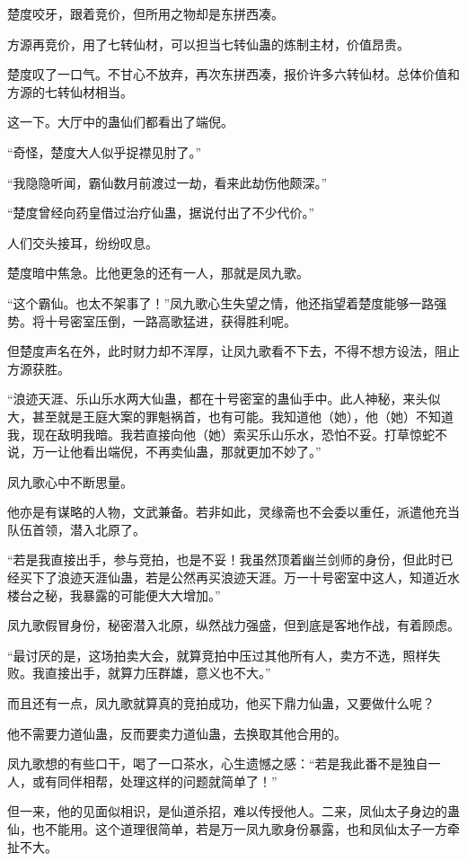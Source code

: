 \begin{this_body}
楚度咬牙，跟着竞价，但所用之物却是东拼西凑。

方源再竞价，用了七转仙材，可以担当七转仙蛊的炼制主材，价值昂贵。

楚度叹了一口气。不甘心不放弃，再次东拼西凑，报价许多六转仙材。总体价值和方源的七转仙材相当。

这一下。大厅中的蛊仙们都看出了端倪。

“奇怪，楚度大人似乎捉襟见肘了。”

“我隐隐听闻，霸仙数月前渡过一劫，看来此劫伤他颇深。”

“楚度曾经向药皇借过治疗仙蛊，据说付出了不少代价。”

人们交头接耳，纷纷叹息。

楚度暗中焦急。比他更急的还有一人，那就是凤九歌。

“这个霸仙。也太不架事了！”凤九歌心生失望之情，他还指望着楚度能够一路强势。将十号密室压倒，一路高歌猛进，获得胜利呢。

但楚度声名在外，此时财力却不浑厚，让凤九歌看不下去，不得不想方设法，阻止方源获胜。

“浪迹天涯、乐山乐水两大仙蛊，都在十号密室的蛊仙手中。此人神秘，来头似大，甚至就是王庭大案的罪魁祸首，也有可能。我知道他（她），他（她）不知道我，现在敌明我暗。我若直接向他（她）索买乐山乐水，恐怕不妥。打草惊蛇不说，万一让他看出端倪，不再卖仙蛊，那就更加不妙了。”

凤九歌心中不断思量。

他亦是有谋略的人物，文武兼备。若非如此，灵缘斋也不会委以重任，派遣他充当队伍首领，潜入北原了。

“若是我直接出手，参与竞拍，也是不妥！我虽然顶着幽兰剑师的身份，但此时已经买下了浪迹天涯仙蛊，若是公然再买浪迹天涯。万一十号密室中这人，知道近水楼台之秘，我暴露的可能便大大增加。”

凤九歌假冒身份，秘密潜入北原，纵然战力强盛，但到底是客地作战，有着顾虑。

“最讨厌的是，这场拍卖大会，就算竞拍中压过其他所有人，卖方不选，照样失败。我直接出手，就算力压群雄，意义也不大。”

而且还有一点，凤九歌就算真的竞拍成功，他买下鼎力仙蛊，又要做什么呢？

他不需要力道仙蛊，反而要卖力道仙蛊，去换取其他合用的。

凤九歌想的有些口干，喝了一口茶水，心生遗憾之感：“若是我此番不是独自一人，或有同伴相帮，处理这样的问题就简单了！”

但一来，他的见面似相识，是仙道杀招，难以传授他人。二来，凤仙太子身边的蛊仙，也不能用。这个道理很简单，若是万一凤九歌身份暴露，也和凤仙太子一方牵扯不大。


\end{this_body}
